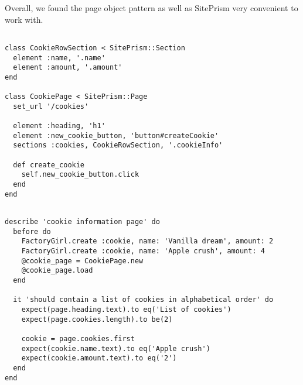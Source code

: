 Overall, we found the page object pattern as well as SitePrism very
convenient to work with.\\

\begin{lstlisting}[caption=Page definition for a page with a list of cookie information.,
                   label=lst:siteprism_page, float=t]

class CookieRowSection < SitePrism::Section
  element :name, '.name'
  element :amount, '.amount'
end

class CookiePage < SitePrism::Page
  set_url '/cookies'

  element :heading, 'h1'
  element :new_cookie_button, 'button#createCookie'
  sections :cookies, CookieRowSection, '.cookieInfo'

  def create_cookie
    self.new_cookie_button.click
  end
end

\end{lstlisting}

\begin{lstlisting}[caption=Browser test using SitePrism a page object defined in
                           code listing \ref{lst:siteprism_page}.,
                   label=lst:siteprism_test, float=t]

describe 'cookie information page' do
  before do
    FactoryGirl.create :cookie, name: 'Vanilla dream', amount: 2
    FactoryGirl.create :cookie, name: 'Apple crush', amount: 4
    @cookie_page = CookiePage.new
    @cookie_page.load
  end

  it 'should contain a list of cookies in alphabetical order' do
    expect(page.heading.text).to eq('List of cookies')
    expect(page.cookies.length).to be(2)

    cookie = page.cookies.first
    expect(cookie.name.text).to eq('Apple crush')
    expect(cookie.amount.text).to eq('2')
  end
end

\end{lstlisting}
